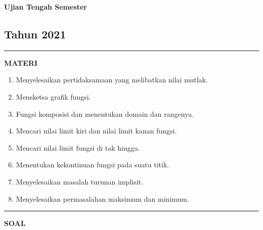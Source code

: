 \newpage
\begin{flushright}
    \textbf{\Large{Ujian Tengah Semester}}
    \subsection*{Tahun 2021}
\end{flushright}
\vspace{0.5cm}
\hrule height 2pt
\vspace{0.5cm}
\begin{center}
    \textbf{\large{MATERI}}
    \begin{enumerate}[leftmargin=*, label={\arabic*}.]
        \item Menyelesaikan pertidaksamaan yang melibatkan nilai mutlak.
        \item Mensketsa grafik fungsi.
        \item Fungsi komposisi dan menentukan domain dan rangenya.
        \item Mencari nilai limit kiri dan nilai limit kanan fungsi.
        \item Mencari nilai limit fungsi di tak hingga.
        \item Menentukan kekontinuan fungsi pada suatu titik.
        \item Menyelesaikan masalah turunan implisit.
        \item Menyelesaikan permasalahan maksimum dan minimum.
    \end{enumerate}
\end{center}
\vspace{0.2cm}
\hrule height 1pt
\vspace{0.5cm}
\begin{center}
    \textbf{\large{SOAL}}
\end{center}
